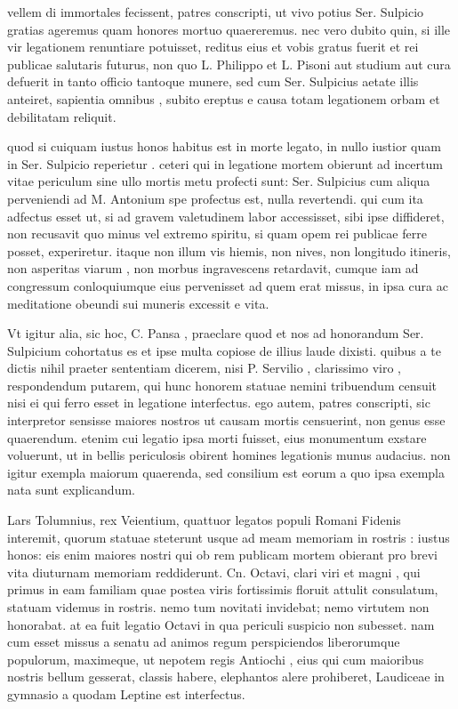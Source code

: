 
 vellem di immortales fecissent, patres conscripti, ut vivo potius Ser. Sulpicio gratias ageremus quam honores mortuo quaereremus. nec vero dubito quin, si ille vir legationem renuntiare potuisset, reditus eius et vobis gratus fuerit et rei publicae salutaris futurus, non quo L. Philippo et L. Pisoni aut studium aut cura defuerit in tanto officio tantoque munere, sed cum Ser. Sulpicius aetate illis anteiret, sapientia omnibus , subito ereptus e causa totam legationem orbam et debilitatam reliquit.

 quod si cuiquam iustus honos habitus est in morte legato, in nullo iustior quam in Ser. Sulpicio reperietur . ceteri qui in legatione mortem obierunt ad incertum vitae periculum sine ullo mortis metu profecti sunt: Ser. Sulpicius cum aliqua perveniendi ad M. Antonium spe profectus est, nulla revertendi. qui cum ita adfectus esset ut, si ad gravem valetudinem labor accessisset, sibi ipse diffideret, non recusavit quo minus vel extremo spiritu, si quam opem rei publicae ferre posset, experiretur. itaque non illum vis hiemis, non nives, non longitudo itineris, non asperitas viarum , non morbus ingravescens retardavit, cumque iam ad congressum conloquiumque eius pervenisset ad quem erat missus, in ipsa cura ac meditatione obeundi sui muneris excessit e vita.

 Vt igitur alia, sic hoc, C. Pansa , praeclare quod et nos ad honorandum Ser. Sulpicium cohortatus es et ipse multa copiose de illius laude dixisti. quibus a te dictis nihil praeter sententiam dicerem, nisi P. Servilio , clarissimo viro , respondendum putarem, qui hunc honorem statuae nemini tribuendum censuit nisi ei qui ferro esset in legatione interfectus. ego autem, patres conscripti, sic interpretor sensisse maiores nostros ut causam mortis censuerint, non genus esse quaerendum. etenim cui legatio ipsa morti fuisset, eius monumentum exstare voluerunt, ut in bellis periculosis obirent homines legationis munus audacius. non igitur exempla maiorum quaerenda, sed consilium est eorum a quo ipsa exempla nata sunt explicandum.

 Lars Tolumnius, rex Veientium, quattuor legatos populi Romani Fidenis interemit, quorum statuae steterunt usque ad meam memoriam in rostris : iustus honos: eis enim maiores nostri qui ob rem publicam mortem obierant pro brevi vita diuturnam memoriam reddiderunt. Cn. Octavi, clari viri et magni , qui primus in eam familiam quae postea viris fortissimis floruit attulit consulatum, statuam videmus in rostris. nemo tum novitati invidebat; nemo virtutem non honorabat. at ea fuit legatio Octavi in qua periculi suspicio non subesset. nam cum esset missus a senatu ad animos regum perspiciendos liberorumque populorum, maximeque, ut nepotem regis Antiochi , eius qui cum maioribus nostris bellum gesserat, classis habere, elephantos alere prohiberet, Laudiceae in gymnasio a quodam Leptine est interfectus.

